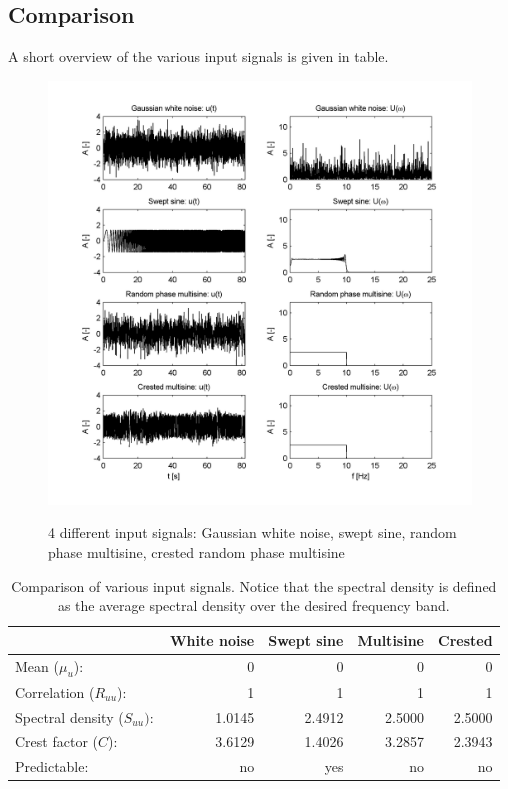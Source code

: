 \subsection{Comparison}
A short overview of the various input signals is given in table.
		\begin{figure}
			\centering
				\includegraphics{images/u}
			\label{fig:u}
			\caption{4 different input signals: Gaussian white noise, swept sine, random phase multisine, crested random phase multisine}
		\end{figure}
\begin{table}
		\centering
		\begin{tabular}{lrrrr}
		\toprule
																			& White noise & Swept sine & Multisine & Crested  \\
		\midrule
		Mean ($\mu_u$):					& 0 & 0 & 0 & 0 \\
		Correlation ($R_{uu}$):	& 1 & 1 & 1 & 1 \\
		Spectral density ($S_{uu}):$ 										& 1.0145 &   2.4912  &  2.5000  &  2.5000 \\
		Crest factor ($C$): 						& 3.6129   & 1.4026  &  3.2857   & 2.3943 \\
		Predictable: 								& no & yes & no & no \\
		\bottomrule
		\end{tabular}
		\label{table:u}
		\caption{Comparison of various input signals. Notice that the spectral density is defined as the average spectral density over the desired frequency band.}
\end{table}

